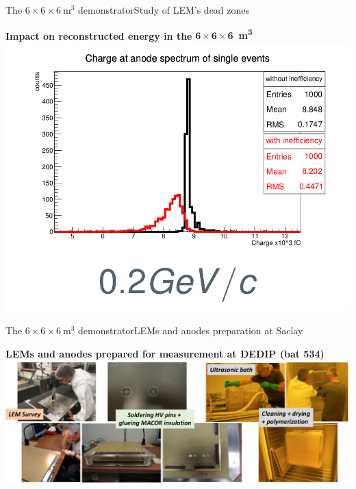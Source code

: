 \documentclass[10pt]{beamer}
\begin{document}
\begin{frame}{The \texorpdfstring{$6 \times 6 \times \SI{6}{\meter\cubed}$}{666} demonstrator}{Study of LEM's dead zones}
\begin{scriptsize}
\begin{minipage}{0.58\textwidth}
\begin{minipage}{0.48\textwidth}
    			\end{minipage}\hfill
    			\begin{minipage}{0.48\textwidth}
    				\centering
    				\textbf{Impact on reconstructed energy in the} $\mathbf{6 \times 6 \times} $\textbf{\SI[detect-weight]{6}{\meter\cubed}}\\
    				\includegraphics[width=\textwidth]{figures/666/electron.png}
    			\end{minipage}
    		\end{minipage}
    	\end{scriptsize} 
    \end{frame}
    
    \begin{frame}{The \texorpdfstring{$6 \times 6 \times \SI{6}{\meter\cubed}$}{666} demonstrator}{LEMs and anodes preparation at Saclay}
    	\begin{scriptsize}
    		\begin{center}
		    	\textbf{LEMs and anodes prepared for measurement at DEDIP (bat 534)}\\
		    	\includegraphics[width=\textwidth]{figures/666/lem_preparation.png}
	    	\end{center}
	    \end{scriptsize} 
    \end{frame}
    
\end{document}
